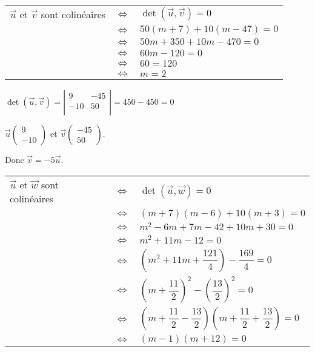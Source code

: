 \begin{tabular}{lll}
$\vec{u}$ et $\vec{v}$ sont colinéaires & $\Longleftrightarrow$ & $\det\left(\vec{u}, \vec{v}\right) = 0$ \\
& $\Longleftrightarrow$ & $ 50\left(m+7\right) + 10 \left(m - 47\right) = 0$ \\
& $\Longleftrightarrow$ & $ 50m + 350 + 10m - 470 = 0 $ \\
& $\Longleftrightarrow$ & $ 60m - 120 = 0 $ \\
& $\Longleftrightarrow$ & $ 60 = 120 $ \\
& $\Longleftrightarrow$ & $ m = 2 $ \\
\end{tabular}

$\det\left(\vec{u}, \vec{v}\right) = \left| \begin{array}{cc}  9 & -45 \\ -10 & 50  \\ \end{array} \right| = 450 - 450 = 0 $

$\vec{u}\left(\begin{array}{c} 9\\ -10 \end{array}\right)$ et $\vec{v}\left(\begin{array}{c} -45\\ 50 \end{array}\right)$.

Donc $\vec{v} = -5\vec{u} $.\\

\begin{tabular}{lll}
$\vec{u}$ et $\overrightarrow{w}$ sont colinéaires & $\Longleftrightarrow$ & $\det\left(\vec{u}, \overrightarrow{w}\right) = 0$ \\
& $\Longleftrightarrow$ & $\left(m+7\right)\left(m-6\right) + 10 \left(m+3\right) = 0 $ \\
& $\Longleftrightarrow$ & $m^2 - 6m + 7m - 42 + 10m + 30 = 0 $\\
& $\Longleftrightarrow$ & $ m^2 +11m -12 = 0 $ \\
& $\Longleftrightarrow$ & $ \left(m^2 + 11m + \dfrac{121}{4} \right) - \dfrac{169}{4} = 0 $ \\
& $\Longleftrightarrow$ & $ \left(m+\dfrac{11}{2} \right)^2 - \left(\dfrac{13}{2} \right)^2 = 0 $ \\
& $\Longleftrightarrow$ & $ \left(m + \dfrac{11}{2} - \dfrac{13}{2} \right) \left(m + \dfrac{11}{2} + \dfrac{13}{2}\right) = 0 $ \\
& $\Longleftrightarrow$ & $ \left(m-1\right)\left(m + 12\right) = 0 $ \\
\end{tabular}

